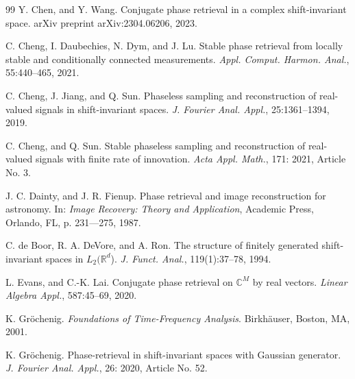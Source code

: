 \documentclass[12pt,oneside,reqno]{amsart}
\newcommand{\R}{\mathbb{R}}
\newcommand{\C}{\mathbb{C}}
\numberwithin{equation}{section}
\begin{document}
\begin{thebibliography}{99}
	Y. Chen, and Y. Wang. Conjugate phase retrieval in a complex shift-invariant space. arXiv preprint arXiv:2304.06206, 2023.
	
	C. Cheng, I. Daubechies, N. Dym, and J. Lu. Stable phase retrieval from locally stable and conditionally connected measurements. \emph{Appl. Comput. Harmon. Anal.}, 55:440--465, 2021.
	
	C. Cheng, J. Jiang, and Q. Sun. Phaseless sampling and reconstruction of real-valued signals in shift-invariant spaces. \emph{J. Fourier Anal. Appl.}, 25:1361--1394, 2019.
	
	C. Cheng, and Q. Sun. Stable phaseless sampling and reconstruction of real-valued signals with finite rate of innovation. \emph{Acta Appl. Math.}, 171: 2021, Article No. 3.
	
	J. C. Dainty, and J. R. Fienup. Phase retrieval and image reconstruction for astronomy. In: \emph{Image Recovery: Theory and Application}, Academic Press, Orlando, FL, p. 231---275, 1987.
	
	C. de Boor, R. A. DeVore, and A. Ron. The structure of finitely generated shift-invariant spaces in $L_2 (\R^d$). \emph{J. Funct. Anal.}, 119(1):37--78, 1994.
		
	
	
	L. Evans, and C.-K. Lai. Conjugate phase retrieval on $\C^M$ by real vectors. \emph{Linear Algebra Appl.}, 587:45--69, 2020.
	
	
	
	
	
	
	K. Gr{\"o}chenig. \emph{Foundations of Time-Frequency Analysis}. Birkh{\"a}user, Boston, MA, 2001.
	
	K. Gr{\"o}chenig. Phase-retrieval in shift-invariant spaces with Gaussian generator. \emph{J. Fourier Anal. Appl.}, 26: 2020, Article No. 52.
	

\end{thebibliography}
\end{document}
